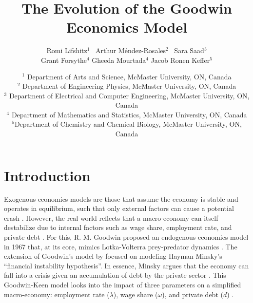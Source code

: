 \documentclass[12pt, centerh1]{article}
\title{The Evolution of the Goodwin Economics Model}
\author{\qquad Romi Lifshitz$^{1}$ \qquad\  Arthur M\'endez-Rosales$^{2}$ \qquad\  Sara Saad$^{3}$ \\ Grant Forsythe$^{4}$ \qquad Gheeda Mourtada$^{4}$ \qquad Jacob Ronen Keffer$^{5}$}
\date{
{\footnotesize $^1$ Department of Arts and Science, McMaster University, ON, Canada\\[-6pt]
$^2$ Department of Engineering Physics, McMaster University, ON, Canada \\[-6pt]
$^3$ Department of Electrical and Computer Engineering, McMaster University, ON, Canada\\[-6pt]
$^4$ Department of Mathematics and Statistics, McMaster University, ON, Canada\\[-6pt]
$^5$Department of Chemistry and Chemical Biology, McMaster University, ON, Canada\\[-6pt]}
}
\begin{document}
\clearpage\maketitle
\setcounter{page}{1}
\section{Introduction} \label{s:intro}

Exogenous economics models are those that assume the economy is stable and operates in equilibrium, such that only external factors can cause a potential crash \citep{ganti_2019}. However, the real world reflects that a macro-economy can itself destabilize due to internal factors such as wage share, employment rate, and private debt \citep{minsky1992financial}. For this, R. M. Goodwin proposed an endogenous economics model in 1967 that, at its core, mimics Lotka-Volterra prey-predator dynamics \citep{goodwin1982growth}. The extension of Goodwin’s model by \citet{keen1995finance} focused on modeling Hayman Minsky’s “financial instability hypothesis”. In essence, Minsky argues that the economy can fall into a crisis given an accumulation of debt by the private sector \citep{minsky1992financial}. This Goodwin-Keen model looks into the impact of three parameters on a simplified macro-economy: employment rate ($\lambda$), wage share ($\omega$), and private debt ($d$) \citep{grasselli2012analysis,maheshwari2015empirical}.
\end{document}
